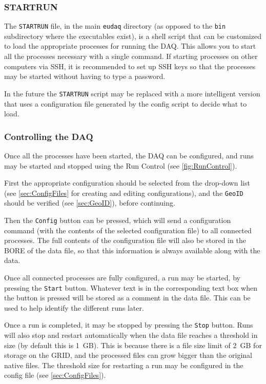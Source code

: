 \subsubsection{STARTRUN}\label{sec:STARTRUN}
The \texttt{STARTRUN} file, in the main \texttt{eudaq} directory
(as opposed to the \texttt{bin} subdirectory where the executables exist),
is a shell script that can be customized to load the appropriate processes for running the DAQ.
This allows you to start all the processes necessary with a single command.
If starting processes on other computers via SSH,
it is recommended to set up SSH keys so that the processes may be started without having to type a password.

In the future the \texttt{STARTRUN} script may be replaced with a more intelligent version
that uses a configuration file generated by the config script to decide what to load.

\subsubsection{Controlling the DAQ}
Once all the processes have been started, the DAQ can be configured, and runs may be started and stopped
using the Run Control (see \autoref{fig:RunControl}).

First the appropriate configuration should be selected from the drop-down list
(see \autoref{sec:ConfigFiles} for creating and editing configurations),
and the \texttt{GeoID} should be verified (see \autoref{sec:GeoID}), before continuing.

Then the \texttt{Config} button can be pressed,
which will send a configuration command
(with the contents of the selected configuration file) to all connected processes.
The full contents of the configuration file will also be stored
in the \gls{BORE} of the data file,
so that this information is always available along with the data.

Once all connected processes are fully configured, a run may be started, by pressing the \texttt{Start} button.
Whatever text is in the corresponding text box when the button is pressed
will be stored as a comment in the data file.
This can be used to help identify the different runs later.

Once a run is completed, it may be stopped by pressing the \texttt{Stop} button.
Runs will also stop and restart automatically when the data file reaches a threshold in size
(by default this is 1~GB).
This is because there is a file size limit of 2~GB for storage on the GRID,
and the processed files can grow bigger than the original native files.
The threshold size for restarting a run may be configured in the config file (see \autoref{sec:ConfigFiles}).

